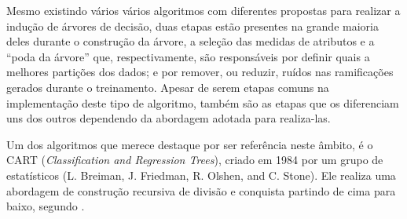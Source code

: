 \documentclass[oneside,openright,12pt]{ufsm_2015} %
\begin{document}
    \par Mesmo existindo vários vários algoritmos com diferentes propostas para realizar a indução de árvores de decisão, duas etapas estão presentes na grande maioria deles durante o construção da árvore, a seleção das medidas de atributos e a ``poda da árvore'' que, respectivamente, são responsáveis por definir quais a melhores partições dos dados; e por remover, ou reduzir, ruídos nas ramificações gerados durante o treinamento. Apesar de serem etapas comuns na implementação deste tipo de algoritmo, também são as etapas que os diferenciam uns dos outros dependendo da abordagem adotada para realiza-las.
    
    \par Um dos algoritmos que merece destaque por ser referência neste âmbito, é o CART (\textit{Classification and Regression Trees}), criado em 1984 por um grupo de estatísticos (L. Breiman, J. Friedman, R. Olshen, and C. Stone). Ele realiza uma abordagem de construção recursiva de divisão e conquista partindo de cima para baixo, segundo \cite{book:han:11}.
\end{document}
